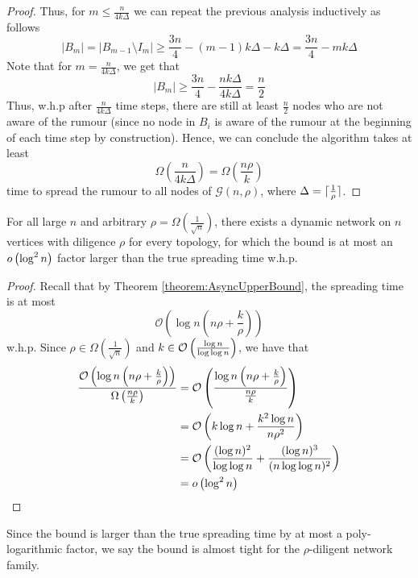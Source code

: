 \begin{proof}
	Thus, for $m \leq \frac{n}{4k\Delta}$ we can repeat the previous analysis inductively as follows %
	$$
		|B_m| = |B_{m-1} \setminus I_m| \geq \frac{3n}{4} - (m-1)k\Delta - k\Delta = \frac{3n}{4} - mk\Delta
	$$
	Note that for $m = \frac{n}{4k\Delta}$, we get that 
	$$
		|B_m| \geq \frac{3n}{4} - \frac{nk\Delta}{4k\Delta} = \frac{n}{2}
	$$
	Thus, w.h.p after $\frac{n}{4k\Delta}$ time steps, there are still at least $\frac{n}{2}$ nodes who are not aware of the rumour (since no node in $B_i$ is aware of the rumour at the beginning of each time step by construction). Hence, we can conclude the algorithm takes at least 
	$$
		\Omega\left(\frac{n}{4k\Delta}\right) = \Omega\left(\frac{n\rho}{k}\right)
	$$
	time to spread the rumour to all nodes of $\mathcal{G}(n, \rho)$, where $\Delta = \lceil\frac{1}{\rho}\rceil$.
\end{proof}


\begin{corollary}
	For all large $n$ and arbitrary $\rho = \Omega\left(\frac{1}{\sqrt{n}}\right)$, there exists a dynamic network on $n$ vertices with diligence $\rho$ for every topology, for which the bound is at most an $o\left( \log^2 n \right)$ factor larger than the true spreading time w.h.p.
\end{corollary}

\begin{proof}
	Recall that by Theorem \ref{theorem:AsyncUpperBound}, the spreading time is at most
	$$
		\mathcal{O}\left(\log n \left(n \rho + \frac{k}{\rho}\right)\right)
	$$
	w.h.p.
	Since $\rho \in \Omega\left(\frac{1}{\sqrt{n}}\right)$ and  $k \in \mathcal{O} \left( \frac{\log n}{\log \log n} \right)$, we have that
	\begin{align*}
		\frac{\mathcal{O} \left( \log n \left( n \rho + \frac{k}{\rho} \right) \right)}{\Omega \left( \frac{n\rho}{k} \right)} 
		&= \mathcal{O} \left( \frac{\log n \left( n \rho + \frac{k}{\rho} \right)}{\frac{n\rho}{k}} \right) \\
		&= \mathcal{O} \left( k \log n + \frac{k^2 \log n}{n \rho^2} \right) \\
		&= \mathcal{O} \left( \frac{(\log n)^2}{\log \log n}  + \frac{(\log n)^3}{(n \log \log n)^2} \right) \\
		&= o\left( \log^2 n \right)
	\end{align*}
	
\end{proof}

Since the bound is larger than the true spreading time by at most a poly-logarithmic factor, we say the bound is almost tight for the $\rho$-diligent network family. 
